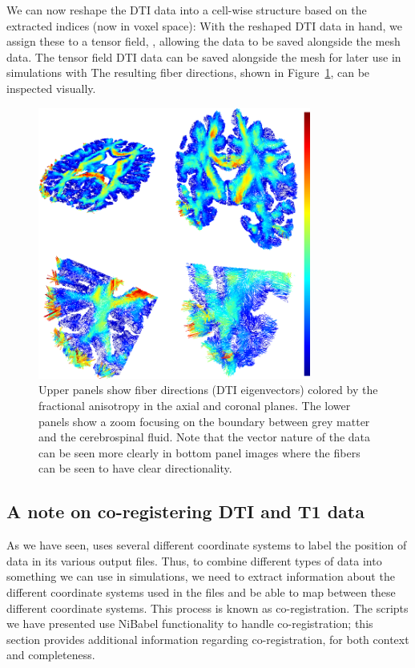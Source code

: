 We can now reshape the DTI data into a cell-wise structure based on the 
extracted indices (now in voxel space):
\noindent With the reshaped DTI data in hand, we assign these to a {\fenics} tensor 
field, , allowing the data to be saved alongside the mesh data.
The {\fenics} tensor field DTI data can be saved alongside the mesh for later use 
in {\fenics} simulations with 
The resulting fiber directions, shown in Figure~\ref{fig:chp5:freesurfer-parc}, 
can be inspected visually.
\begin{figure}	
  \begin{center}
  \includegraphics[width=0.8\textwidth]{./graphics/chp5/fiber-fa-2cb.png}
  \end{center}
\caption{Upper panels show fiber directions (DTI eigenvectors) colored
  by the fractional anisotropy in the axial and coronal planes. The lower 
  panels show a zoom focusing on the boundary between grey matter and the 
  cerebrospinal fluid. Note that the vector nature of the data can be seen 
  more clearly in bottom panel images where the fibers can be seen to have 
  clear directionality.}
\label{fig:chp5:freesurfer-parc} 
\end{figure}

\subsection{A note on co-registering DTI and T1 data}
\label{sec:chp-dti:freesurfer-coord}
As we have seen, {\freesurfer} uses several different coordinate
systems to label the position of data in its various output files.
Thus, to combine different types of data into something we can use in
{\fenics} simulations, we need to extract information about the
different coordinate systems used in the files and be able to map
between these different coordinate systems. This process is known as
co-registration. The scripts we have presented use NiBabel
functionality to handle co-registration; this section provides 
additional information regarding co-registration, for both context and
completeness.

